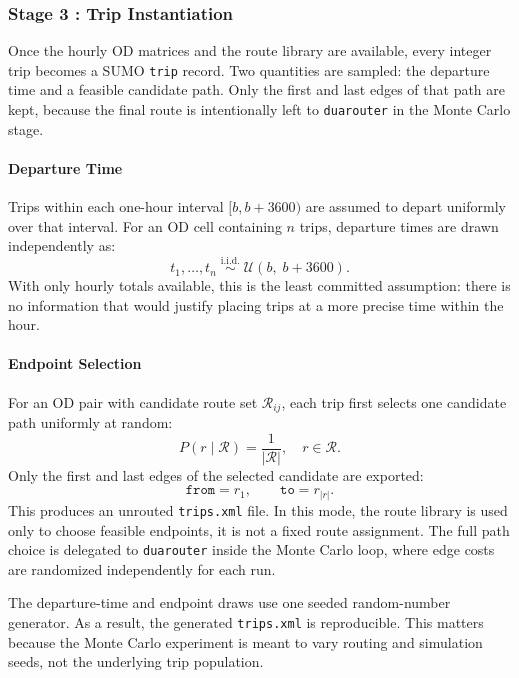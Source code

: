 \subsubsection{Stage 3 : Trip Instantiation}
\label{sssec:vehicle_instantiation}

Once the hourly OD matrices and the route library are available, every integer
trip becomes a SUMO \texttt{trip} record. Two quantities are sampled: the
departure time and a feasible candidate path. Only the first and last edges of
that path are kept, because the final route is intentionally left to
\texttt{duarouter} in the Monte Carlo stage.

\paragraph{Departure Time}
\label{par:departure_time}

Trips within each one-hour interval $[b, b+3600)$ are assumed
to depart uniformly over that interval.  For an OD cell containing $n$ trips,
departure times are drawn independently as:
\begin{equation}
  t_1,\ldots,t_n \;\overset{\mathrm{i.i.d.}}{\sim}\; \mathcal{U}(b,\; b+3600).
\end{equation}
With only hourly totals available, this is the least committed assumption:
there is no information that would justify placing trips at a more precise
time within the hour.

\paragraph{Endpoint Selection}
\label{par:route_selection}

For an OD pair with candidate route set $\mathcal{R}_{ij}$, each trip first
selects one candidate path uniformly at random:
\begin{equation}
  P(r \mid \mathcal{R}) = \frac{1}{|\mathcal{R}|}, \quad r \in \mathcal{R}.
  \label{eq:uniform_choice}
\end{equation}
Only the first and last edges of the selected candidate are exported:
\begin{equation}
  \texttt{from} = r_1, \qquad \texttt{to} = r_{|r|}.
\end{equation}
This produces an unrouted \texttt{trips.xml} file. In this mode, the route
library is used only to choose feasible endpoints, it is not a fixed route
assignment. The full path choice is delegated to \texttt{duarouter} inside the
Monte Carlo loop, where edge costs are randomized independently for each run.

The departure-time and endpoint draws use one seeded random-number generator.
As a result, the generated \texttt{trips.xml} is reproducible. This matters
because the Monte Carlo experiment is meant to vary routing and simulation
seeds, not the underlying trip population.


